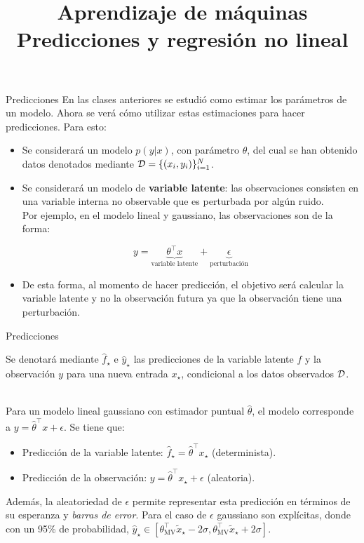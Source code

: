 \documentclass[9pt]{beamer}
\title{\textbf{Aprendizaje de máquinas} \\ Predicciones y regresión no lineal}
\begin{document}
\begin{frame}
  \titlepage
\end{frame}

\begin{frame}{Predicciones}
	En las clases anteriores se estudió como estimar los parámetros de un modelo. Ahora se verá cómo utilizar estas estimaciones para hacer predicciones. Para esto:
	
	\begin{itemize}
		\item Se considerará un modelo $p(y|x)$, con parámetro $\theta$, del cual se han obtenido datos denotados mediante ${\mathcal D} = \{(x_i,y_i)\}_{i=1}^N$.\pause
		\item Se considerará un modelo de \textbf{variable latente}: las observaciones consisten en una variable interna no observable que es perturbada por algún ruido. \\
		Por ejemplo, en el modelo lineal y gaussiano, las observaciones son de la forma:

			\begin{equation*}
				y= \underbrace{\theta^\top x}_{\text{variable latente}} + \underbrace{\epsilon}_{\text{perturbación}}
			\end{equation*}\pause
		\item De esta forma, al momento de hacer predicción, el objetivo será calcular la variable latente y no la observación futura ya que la observación tiene una perturbación.
	\end{itemize}
	
\end{frame}

\begin{frame}{Predicciones}

Se denotará mediante $\hat f_\star$ e $\hat y_\star$ las predicciones de la variable latente $f$ y la observación $y$ para una nueva entrada $x_\star$, condicional a los datos observados ${\mathcal D}$.\\~\ \pause

Para un modelo lineal gaussiano con estimador puntual $\hat{\theta}$, el modelo corresponde a $y=\hat{\theta}^\top x + \epsilon$. \pause Se tiene que:

\begin{itemize}
	\item Predicción de la variable latente: $\hat f_\star=\hat{\theta}^\top x_\star$ (determinista).\pause
	\item Predicción de la observación: $y=\hat{\theta}^\top x_\star + \epsilon$ (aleatoria).\pause
\end{itemize}

Además, la aleatoriedad de $\epsilon$ permite representar esta predicción en términos de su esperanza y \emph{barras de error}. Para el caso de $\epsilon$ gaussiano son explícitas, donde con un 95\% de probabilidad, $\hat y_\star\in[\theta_{\text{MV}}^\top \tilde{x}_\star - 2\sigma,\theta_{\text{MV}}^\top \tilde{x}_\star + 2\sigma]$.
	
\end{frame}
\end{document}
